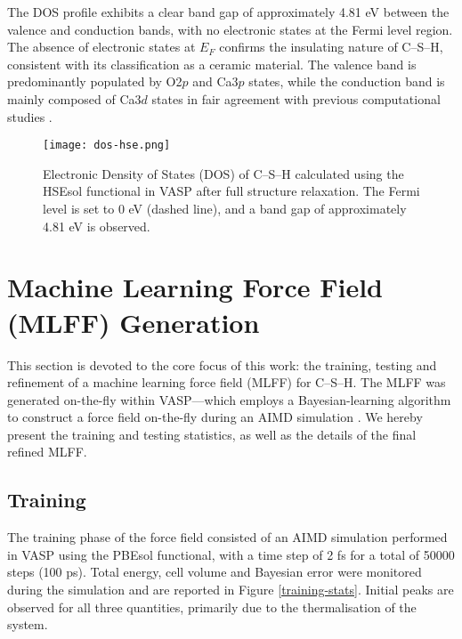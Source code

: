 The DOS profile exhibits a clear band gap of approximately 4.81 eV between the valence and conduction bands, with no electronic states at the Fermi level region. The absence of electronic states at $E_F$ confirms the insulating nature of C--S--H, consistent with its classification as a ceramic material. The valence band is predominantly populated by O2$p$ and Ca3$p$ states, while the conduction band is mainly composed of Ca3$d$ states in fair agreement with previous computational studies \cite{Dharmawardhana2018}. 
\begin{figure}[H]
    \centering
    \texttt{[image: dos-hse.png]}
    \caption{
        Electronic Density of States (DOS) of C--S--H calculated using the HSEsol functional in VASP after full structure relaxation. The Fermi level is set to 0 eV (dashed line), and a band gap of approximately 4.81 eV is observed. 
    }
    \label{dos}
\end{figure}

\section{Machine Learning Force Field (MLFF) Generation}
\label{sec:mlff-training}

This section is devoted to the core focus of this work: the training, testing and refinement of a machine learning force field (MLFF) for C--S--H. The MLFF was generated on-the-fly within VASP---which employs a Bayesian-learning algorithm to construct a force field on-the-fly during an AIMD simulation \cite{zotero-item-773}. We hereby present the training and testing statistics, as well as the details of the final refined MLFF. 
\subsection{Training}
The training phase of the force field consisted of an AIMD simulation performed in VASP using the PBEsol functional, with a time step of 2 fs for a total of 50000 steps (100 ps). Total energy, cell volume and Bayesian error were monitored during the simulation and are reported in Figure \ref{training-stats}. Initial peaks are observed for all three quantities, primarily due to the thermalisation of the system.

